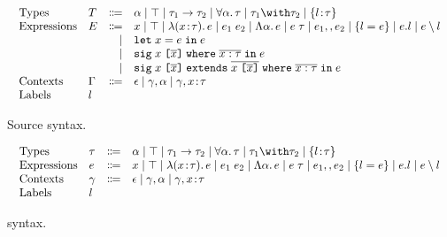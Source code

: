 \documentclass[a4paper]{article}
\begin{document}
\begin{figure}
  \begin{displaymath}
    \begin{array}{l}
      \begin{array}{llrl}
        \text{Types}
        & T & \Coloneqq & \alpha \mid \top \mid \tau_1 \to \tau_2 \mid \for \alpha \tau \mid \tau_1 \andop \tau_2 \mid \recty l \tau \\
        \text{Expressions}
        & E & \Coloneqq & x \mid \top \mid \lam x \tau e \mid \app {e_1} {e_2} \mid \blam \alpha e \mid \tapp e \tau \mid e_1 \mergeop e_2 \mid \reccon l e \mid e.l \mid e \restrictop l \\
        &   & \mid & \letexpr x e e \\
        &   & \mid & \sig x x x \tau e \\
        &   & \mid & \sigextends x x x x x \tau e \\
        \text{Contexts} & \Gamma & \Coloneqq & \epsilon \mid \gamma, \alpha \mid \gamma, x \hast \tau \\
        \text{Labels} & l
      \end{array}
    \end{array}
  \end{displaymath}

  \caption{Source syntax.}
\end{figure}

\begin{figure}
  \begin{displaymath}
    \begin{array}{l}
      \begin{array}{llrl}
        \text{Types}
        & \tau & \Coloneqq & \alpha \mid \top \mid \tau_1 \to \tau_2 \mid \for \alpha \tau \mid \tau_1 \andop \tau_2 \mid \recty l \tau \\
        \text{Expressions}
        & e & \Coloneqq & x \mid \top \mid \lam x \tau e \mid \app {e_1} {e_2} \mid \blam \alpha e \mid \tapp e \tau \mid e_1 \mergeop e_2 \mid \reccon l e \mid e.l \mid e \restrictop l \\
        \text{Contexts}
        & \gamma & \Coloneqq & \epsilon \mid \gamma, \alpha \mid \gamma, x \hast \tau \\
        \text{Labels} & l
      \end{array}
    \end{array}
  \end{displaymath}

  \caption{\fand syntax.}
\end{figure}
\end{document}
